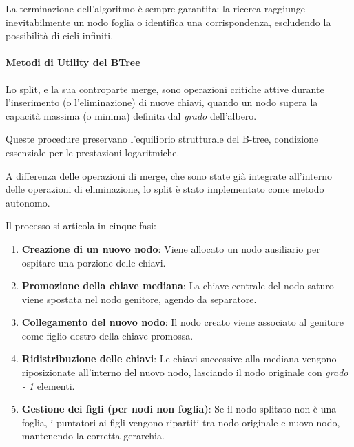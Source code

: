 \documentclass[12pt,a4paper,openright,twoside]{book}
\begin{document}
                    La terminazione dell'algoritmo è sempre garantita: la ricerca raggiunge inevitabilmente un nodo foglia o identifica una corrispondenza, escludendo la possibilità di cicli infiniti.

                \paragraph{Metodi di Utility del BTree}

                    

                    Lo split, e la sua controparte merge, sono operazioni critiche attive durante l'inserimento (o l'eliminazione) di nuove chiavi, quando un nodo supera la capacità massima (o minima) definita dal \textit{grado} dell'albero.

                    Queste procedure preservano l'equilibrio strutturale del B-tree, condizione essenziale per le prestazioni logaritmiche.

                    A differenza delle operazioni di merge, che sono state già integrate all'interno delle operazioni di eliminazione, lo split è stato implementato come metodo autonomo.

                    Il processo si articola in cinque fasi:
                    \begin{enumerate}
                        \item \textbf{Creazione di un nuovo nodo}: Viene allocato un nodo ausiliario per ospitare una porzione delle chiavi.
                        \item \textbf{Promozione della chiave mediana}: La chiave centrale del nodo saturo viene spostata nel nodo genitore, agendo da separatore.
                        \item \textbf{Collegamento del nuovo nodo}: Il nodo creato viene associato al genitore come figlio destro della chiave promossa.
                        \item \textbf{Ridistribuzione delle chiavi}: Le chiavi successive alla mediana vengono riposizionate all'interno del nuovo nodo, lasciando il nodo originale con \textit{grado - 1} elementi.
                        \item \textbf{Gestione dei figli (per nodi non foglia)}: Se il nodo splitato non è una foglia, i puntatori ai figli vengono ripartiti tra nodo originale e nuovo nodo, mantenendo la corretta gerarchia.
                    \end{enumerate}
\end{document}
